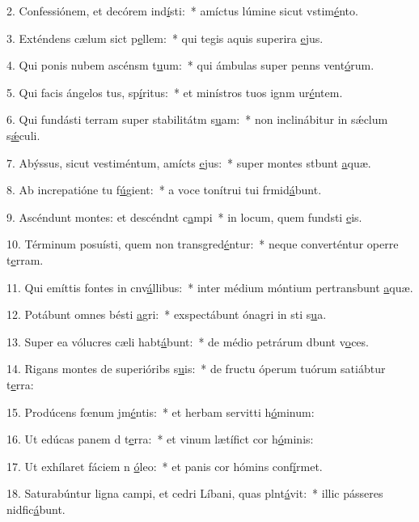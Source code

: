 2. Confessiónem, et decórem ind\uline{í}sti:~* amíctus lúmine sicut vstim\uline{é}nto.\par 
3. Exténdens cælum sict p\uline{e}llem:~* qui tegis aquis superira \uline{e}jus.\par 
4. Qui ponis nubem ascénsm t\uline{u}um:~* qui ámbulas super penns vent\uline{ó}rum.\par 
5. Qui facis ángelos tus, sp\uline{í}ritus:~* et minístros tuos ignm ur\uline{é}ntem.\par 
6. Qui fundásti terram super stabilitátm s\uline{u}am:~* non inclinábitur in sǽclum s\uline{ǽ}culi.\par 
7. Abýssus, sicut vestiméntum, amícts \uline{e}jus:~* super montes stbunt \uline{a}quæ.\par 
8. Ab increpatióne tu f\uline{ú}gient:~* a voce tonítrui tui frmid\uline{á}bunt.\par 
9. Ascéndunt montes: et descéndnt c\uline{a}mpi~* in locum, quem fundsti \uline{e}is.\par 
10. Términum posuísti, quem non transgred\uline{é}ntur:~* neque converténtur operre t\uline{e}rram.\par 
11. Qui emíttis fontes in cnv\uline{á}llibus:~* inter médium móntium pertransbunt \uline{a}quæ.\par 
12. Potábunt omnes bésti \uline{a}gri:~* exspectábunt ónagri in sti s\uline{u}a.\par 
13. Super ea vólucres cæli habt\uline{á}bunt:~* de médio petrárum dbunt v\uline{o}ces.\par 
14. Rigans montes de superióribs s\uline{u}is:~* de fructu óperum tuórum satiábtur t\uline{e}rra:\par 
15. Prodúcens fœnum jm\uline{é}ntis:~* et herbam servitti h\uline{ó}minum:\par 
16. Ut edúcas panem d t\uline{e}rra:~* et vinum lætífict cor h\uline{ó}minis:\par 
17. Ut exhílaret fáciem n \uline{ó}leo:~* et panis cor hómins conf\uline{í}rmet.\par 
18. Saturabúntur ligna campi, et cedri Líbani, quas plnt\uline{á}vit:~* illic pásseres nidfic\uline{á}bunt.\par 

